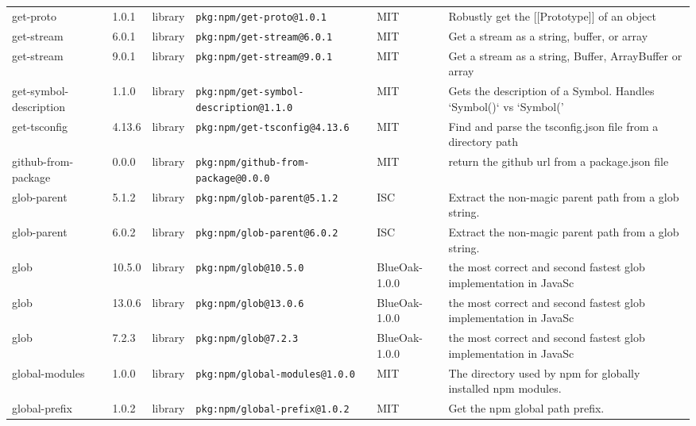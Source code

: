 \documentclass[11pt,a4paper]{article}
\begin{document}
\begin{longtable}{|p{4cm}|p{2cm}|p{1.6cm}|p{5cm}|p{1.5cm}|p{3.5cm}|}
\raggedright get-proto & 1.0.1 & library & \small\texttt{pkg:npm/get-proto@1.0.1} & MIT & \small Robustly get the [[Prototype]] of an object \\
\raggedright get-stream & 6.0.1 & library & \small\texttt{pkg:npm/get-stream@6.0.1} & MIT & \small Get a stream as a string, buffer, or array \\
\raggedright get-stream & 9.0.1 & library & \small\texttt{pkg:npm/get-stream@9.0.1} & MIT & \small Get a stream as a string, Buffer, ArrayBuffer or array \\
\raggedright get-symbol-description & 1.1.0 & library & \small\texttt{pkg:npm/get-symbol-description@1.1.0} & MIT & \small Gets the description of a Symbol. Handles `Symbol()` vs `Symbol(' \\
\raggedright get-tsconfig & 4.13.6 & library & \small\texttt{pkg:npm/get-tsconfig@4.13.6} & MIT & \small Find and parse the tsconfig.json file from a directory path \\
\raggedright github-from-package & 0.0.0 & library & \small\texttt{pkg:npm/github-from-package@0.0.0} & MIT & \small return the github url from a package.json file \\
\raggedright glob-parent & 5.1.2 & library & \small\texttt{pkg:npm/glob-parent@5.1.2} & ISC & \small Extract the non-magic parent path from a glob string. \\
\raggedright glob-parent & 6.0.2 & library & \small\texttt{pkg:npm/glob-parent@6.0.2} & ISC & \small Extract the non-magic parent path from a glob string. \\
\raggedright glob & 10.5.0 & library & \small\texttt{pkg:npm/glob@10.5.0} & BlueOak-1.0.0 & \small the most correct and second fastest glob implementation in JavaSc \\
\raggedright glob & 13.0.6 & library & \small\texttt{pkg:npm/glob@13.0.6} & BlueOak-1.0.0 & \small the most correct and second fastest glob implementation in JavaSc \\
\raggedright glob & 7.2.3 & library & \small\texttt{pkg:npm/glob@7.2.3} & BlueOak-1.0.0 & \small the most correct and second fastest glob implementation in JavaSc \\
\raggedright global-modules & 1.0.0 & library & \small\texttt{pkg:npm/global-modules@1.0.0} & MIT & \small The directory used by npm for globally installed npm modules. \\
\raggedright global-prefix & 1.0.2 & library & \small\texttt{pkg:npm/global-prefix@1.0.2} & MIT & \small Get the npm global path prefix. \\

\end{longtable}
\end{document}
